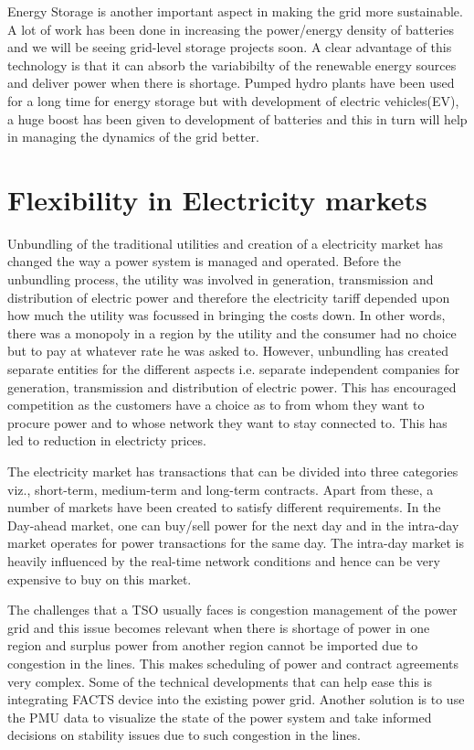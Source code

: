 \documentclass[11pt,a4paper]{article}
\begin{document}
Energy Storage is another important aspect in making the grid more sustainable. A lot of work has been done in increasing the power/energy density of batteries and we will be seeing grid-level storage projects soon. A clear advantage of this technology is that it can absorb the variabibilty of the renewable energy sources and deliver power when there is shortage. Pumped hydro plants have been used for a long time for energy storage but with development of electric vehicles(EV), a huge boost has been given to development of batteries and this in turn will help in managing the dynamics of the grid better.

\section{Flexibility in Electricity markets}
Unbundling of the traditional utilities and creation of a electricity market has changed the way a power system is managed and operated. Before the unbundling process, the utility was involved in generation, transmission and distribution of electric power and therefore the electricity tariff depended upon how much the utility was focussed in bringing the costs down. In other words, there was a monopoly in a region by the utility and the consumer had no choice but to pay at whatever rate he was asked to. However, unbundling has created separate entities for the different aspects i.e. separate independent companies for generation, transmission and distribution of electric power. This has encouraged competition as the customers have a choice as to from whom they want to procure power and to whose network they want to stay connected to. This has led to reduction in electricty prices.

The electricity market has transactions that can be divided into three categories viz., short-term, medium-term and long-term contracts. Apart from these, a number of markets have been created to satisfy different requirements. In the Day-ahead market, one can buy/sell power for the next day and in the intra-day market operates for power transactions for the same day. The intra-day market is heavily influenced by the real-time network conditions and hence can be very expensive to buy on this market.

The challenges that a TSO usually faces is congestion management of the power grid and this issue becomes relevant when there is shortage of power in one region and surplus power from another region cannot be imported due to congestion in the lines. This makes scheduling of power and contract agreements very complex. Some of the technical developments that can help ease this is integrating FACTS device into the existing power grid. Another solution is to use the PMU data to visualize the state of the power system and take informed decisions on stability issues due to such congestion in the lines.
\end{document}
